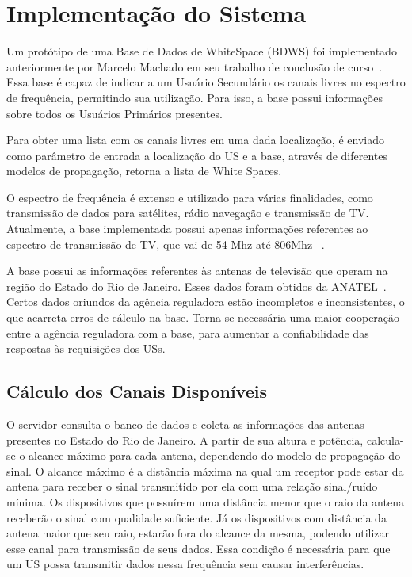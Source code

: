 
\chapter{Implementação do Sistema}

Um protótipo de uma Base de Dados de WhiteSpace (BDWS)
foi implementado anteriormente por Marcelo Machado em seu trabalho de conclusão de curso~\cite{tccmarcelo}. Essa base é capaz de indicar a um Usuário Secundário os canais livres no espectro de frequência, permitindo sua utilização. Para isso, a base possui informações sobre todos os Usuários Primários presentes. 

Para obter uma lista com os canais livres em uma dada localização, é enviado como parâmetro de entrada a localização do US e a base, através de diferentes modelos de propagação, retorna a lista de White Spaces.

O espectro de frequência é extenso e utilizado para várias finalidades, como transmissão de dados para satélites, rádio navegação e transmissão de TV. Atualmente, a base implementada possui apenas informações referentes ao espectro de transmissão de TV, que vai de 54 Mhz até 806Mhz~\cite{fccalloc} .

A base possui as informações referentes às antenas de televisão que operam na região do Estado do Rio de Janeiro. Esses dados foram obtidos da ANATEL~\cite{channelstable}. Certos dados oriundos da agência reguladora estão incompletos e inconsistentes, o que acarreta erros de cálculo na base. Torna-se necessária uma maior cooperação entre a agência reguladora com a base, para aumentar a confiabilidade das respostas às requisições dos USs.

\section{Cálculo dos Canais Disponíveis}

O servidor consulta o banco de dados e coleta as informações das antenas presentes no Estado do Rio de Janeiro. A partir de sua altura e potência, calcula-se o alcance máximo para cada antena, dependendo do modelo de propagação do sinal. O alcance máximo é a distância máxima na qual um receptor pode estar da antena para receber o sinal transmitido por ela com uma relação sinal/ruído mínima. Os dispositivos que possuírem uma distância menor que o raio da antena receberão o sinal com qualidade suficiente. Já os dispositivos com distância da antena maior que seu raio, estarão fora do alcance da mesma, podendo utilizar esse canal para transmissão de seus dados. Essa condição é necessária para que um US possa transmitir dados nessa frequência sem causar interferências.

